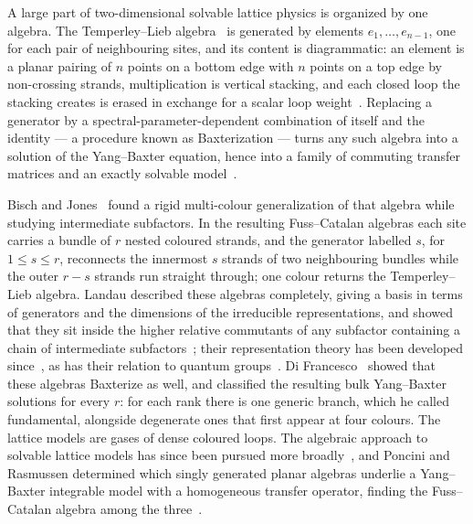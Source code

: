 \documentclass[
  aps,pre,
  reprint,
  superscriptaddress,
  amsmath,amssymb,
  floatfix
]{revtex4-2}
\theoremstyle{plain}
\theoremstyle{definition}
\theoremstyle{remark}
\begin{document}
A large part of two-dimensional solvable lattice physics is organized by one
algebra. The Temperley--Lieb algebra~\cite{temperley1971relations} is generated
by elements $e_1,\dots,e_{n-1}$, one for each pair of neighbouring sites, and
its content is diagrammatic: an element is a planar pairing of $n$ points on a
bottom edge with $n$ points on a top edge by non-crossing strands,
multiplication is vertical stacking, and each closed loop the
stacking creates is erased in exchange for a scalar loop
weight~\cite{Kauffman_1987sm}. Replacing a generator by a
spectral-parameter-dependent combination of itself and the identity --- a
procedure known as Baxterization --- turns any such algebra into a solution of
the Yang--Baxter equation, hence into a family of commuting transfer matrices and an exactly solvable
model~\cite{Baxter_Book,Jimbo_1989it}.

Bisch and Jones~\cite{jones1997algebras} found a rigid multi-colour
generalization of that algebra while studying intermediate subfactors. In the
resulting Fuss--Catalan algebras each site carries a bundle of $r$ nested
coloured strands, and the generator labelled $s$, for $1\le s\le r$, reconnects
the innermost $s$ strands of two neighbouring bundles while the outer $r-s$
strands run straight through; one colour returns the Temperley--Lieb algebra.
Landau described these algebras completely, giving a basis in terms of
generators and the dimensions of the irreducible representations, and showed
that they sit inside the higher relative commutants of any subfactor
containing a chain of intermediate subfactors~\cite{Landau_2001fa}; their
representation theory has been developed since~\cite{Hussein_2019or}, as has
their relation to quantum groups~\cite{Banica_2002qg}. Di
Francesco~\cite{di1998new} showed that these algebras Baxterize as well, and
classified the resulting bulk Yang--Baxter solutions for every $r$: for each
rank there is one generic branch, which he called fundamental, alongside
degenerate ones that first appear at four colours. The lattice models are
gases of dense coloured loops. The algebraic approach to solvable lattice models
has since been pursued more broadly~\cite{babichenko2007algebraic}, and
Poncini and Rasmussen determined which singly generated planar algebras
underlie a Yang--Baxter integrable model with a homogeneous transfer operator,
finding the Fuss--Catalan algebra among the three~\cite{poncini2023integrable}.
\end{document}
